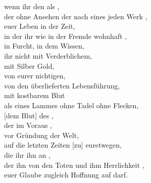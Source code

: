      wenn ihr den als  , \\
        der ohne Ansehen der  nach eines jeden Werk , \\
         euer Leben in der Zeit, \\
        in der ihr wie  in der Fremde wohnhaft , \\
        in Furcht, 
        in dem Wissen, \\
             ihr nicht mit Verderblichem, \\
                mit Silber  Gold, \\
             von eurer nichtigen, \\
            von den  überlieferten Lebensführung,\\
         mit kostbarem Blut\\
            als eines Lammes ohne Tadel  ohne Flecken, \\
                [dem Blut] des , \\
                der im Voraus , \\
                vor Gründung der Welt, \\
                 auf die letzten Zeiten [zu]  euretwegen, \\
            die ihr  ihn an  , \\
            der ihn von den Toten  und ihm Herrlichkeit , \\
         euer Glaube zugleich Hoffnung auf   darf. \\

